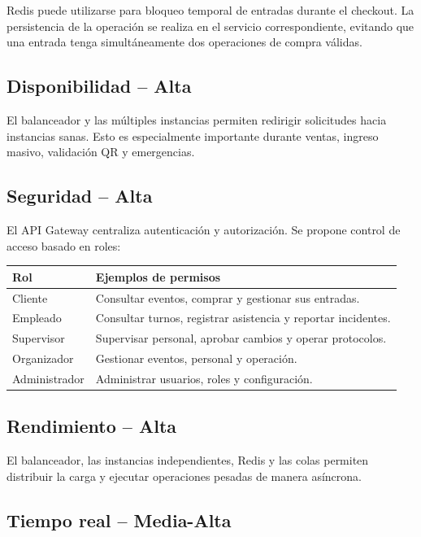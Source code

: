 \documentclass[12pt,a4paper]{article}
\begin{document}
Redis puede utilizarse para bloqueo temporal de entradas durante el checkout. La persistencia de la operación se realiza en el servicio correspondiente, evitando que una entrada tenga simultáneamente dos operaciones de compra válidas.

\subsection{Disponibilidad -- Alta}

El balanceador y las múltiples instancias permiten redirigir solicitudes hacia instancias sanas. Esto es especialmente importante durante ventas, ingreso masivo, validación QR y emergencias.

\subsection{Seguridad -- Alta}

El API Gateway centraliza autenticación y autorización. Se propone control de acceso basado en roles:

\begin{center}
\begin{tabular}{p{3cm}p{8cm}}
\toprule
\textbf{Rol} & \textbf{Ejemplos de permisos}\\
\midrule
Cliente & Consultar eventos, comprar y gestionar sus entradas.\\
Empleado & Consultar turnos, registrar asistencia y reportar incidentes.\\
Supervisor & Supervisar personal, aprobar cambios y operar protocolos.\\
Organizador & Gestionar eventos, personal y operación.\\
Administrador & Administrar usuarios, roles y configuración.\\
\bottomrule
\end{tabular}
\end{center}

\subsection{Rendimiento -- Alta}

El balanceador, las instancias independientes, Redis y las colas permiten distribuir la carga y ejecutar operaciones pesadas de manera asíncrona.

\subsection{Tiempo real -- Media-Alta}
\end{document}
